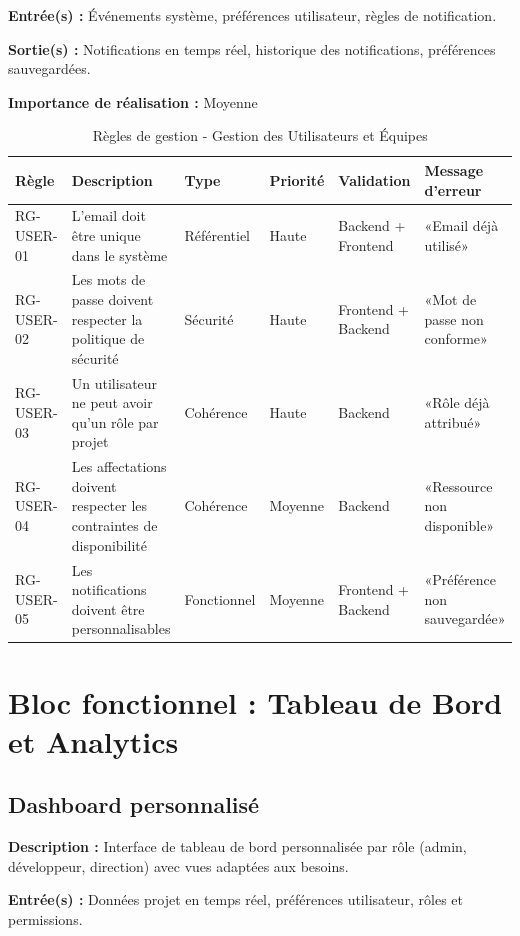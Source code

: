 \textbf{Entrée(s) :} Événements système, préférences utilisateur, règles de notification.

\textbf{Sortie(s) :} Notifications en temps réel, historique des notifications, préférences sauvegardées.

\textbf{Importance de réalisation :} Moyenne

\begin{table}[H]
\centering
\footnotesize
\begin{tabular}{|p{1.5cm}|p{3.5cm}|p{1.5cm}|p{1.5cm}|p{2cm}|p{2.5cm}|}
\hline
\textbf{Règle} & \textbf{Description} & \textbf{Type} & \textbf{Priorité} & \textbf{Validation} & \textbf{Message d'erreur} \\
\hline
RG-USER-01 & L'email doit être unique dans le système & Référentiel & Haute & Backend + Frontend & «Email déjà utilisé» \\
\hline
RG-USER-02 & Les mots de passe doivent respecter la politique de sécurité & Sécurité & Haute & Frontend + Backend & «Mot de passe non conforme» \\
\hline
RG-USER-03 & Un utilisateur ne peut avoir qu'un rôle par projet & Cohérence & Haute & Backend & «Rôle déjà attribué» \\
\hline
RG-USER-04 & Les affectations doivent respecter les contraintes de disponibilité & Cohérence & Moyenne & Backend & «Ressource non disponible» \\
\hline
RG-USER-05 & Les notifications doivent être personnalisables & Fonctionnel & Moyenne & Frontend + Backend & «Préférence non sauvegardée» \\
\hline
\end{tabular}
\caption{Règles de gestion - Gestion des Utilisateurs et Équipes}
\label{tab:rg_utilisateurs}
\end{table}

\section{Bloc fonctionnel : Tableau de Bord et Analytics}

\subsection{Dashboard personnalisé}
\textbf{Description :} Interface de tableau de bord personnalisée par rôle (admin, développeur, direction) avec vues adaptées aux besoins.

\textbf{Entrée(s) :} Données projet en temps réel, préférences utilisateur, rôles et permissions.

